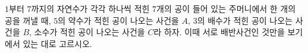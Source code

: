 $1$부터 $7$까지의 자연수가 각각 하나씩 적힌 $7$개의 공이 들어 있는 주머니에서 한 개의 공을 꺼낼 때, $5$의 약수가 적힌 공이 나오는 사건을 $A$, $3$의 배수가 적힌 공이 나오는 사건을 $B$, 소수가 적힌 공이 나오는 사건을 $C$라 하자. 이때 서로 배반사건인 것만을 보기에서 있는 대로 고르시오. 

